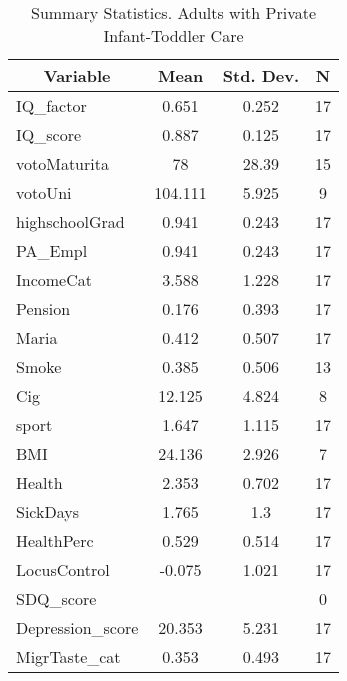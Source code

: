 
\begin{table}[htbp]\centering \caption{Summary Statistics. Adults with Private Infant-Toddler Care \label{schoolAdultasiloPriv}}
\begin{tabular}{l c c  c}\hline\hline
\multicolumn{1}{c}{\textbf{Variable}} & \textbf{Mean}
 & \textbf{Std. Dev.} & \textbf{N}\\ \hline
IQ\_factor & 0.651 & 0.252  & 17\\
IQ\_score & 0.887 & 0.125  & 17\\
votoMaturita & 78 & 28.39  & 15\\
votoUni & 104.111 & 5.925  & 9\\
highschoolGrad & 0.941 & 0.243  & 17\\
PA\_Empl & 0.941 & 0.243  & 17\\
IncomeCat & 3.588 & 1.228  & 17\\
Pension & 0.176 & 0.393  & 17\\
Maria & 0.412 & 0.507  & 17\\
Smoke & 0.385 & 0.506  & 13\\
Cig & 12.125 & 4.824  & 8\\
sport & 1.647 & 1.115  & 17\\
BMI & 24.136 & 2.926  & 7\\
Health & 2.353 & 0.702  & 17\\
SickDays & 1.765 & 1.3  & 17\\
HealthPerc & 0.529 & 0.514  & 17\\
LocusControl & -0.075 & 1.021  & 17\\
SDQ\_score &  &   & 0\\
Depression\_score & 20.353 & 5.231  & 17\\
MigrTaste\_cat & 0.353 & 0.493  & 17\\
\hline\end{tabular}
\end{table}
